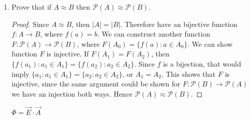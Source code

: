 \documentclass[11pt]{article}
\begin{document}
\begin{enumerate}
		\begin{proof}
			Assume that $\mathbb{R}\setminus \mathbb{Q}$ is countable. We know $\mathbb{Q}$ is countable. This would imply $(\mathbb{R}\setminus\mathbb{Q})\cup \mathbb{Q}=\mathbb{R}$ is countable. This is false however, so $\mathbb{R}\setminus \mathbb{Q}$ must be uncountable.
		\end{proof}
	
		\item Prove that if $A\approx B$ then $\mathscr{P}(A)\approx \mathscr{P}(B)$.
		
		\begin{proof}
			Since $A\approx B$, then $|A|=|B|$. Therefore have an bijective function $f:A\to B$, where $f(a)=b$. We can construct another function $F:\mathscr{P}(A)\to \mathscr{P}(B)$, where $F(A_0)=\{f(a):a\in A_0 \}$. We can show function $F$ is injective. If $F(A_1)=F(A_2)$, then $\{f(a_1):a_1\in A_1\}=\{f(a_2):a_2\in A_2\}$. Since $f$ is a bijection, that would imply $\{a_1:a_1\in A_1 \}=\{a_2:a_2\in A_2 \}$, or $A_1=A_2$. This shows that $F$ is injective, since the same argument could be shown for $F:\mathscr{P}(B)\to\mathscr{P}(A)$ we have an injection both ways. Hence $\mathscr{P}(A)\approx \mathscr{P}(B)$.
		\end{proof}
	
	$\Phi=\vec{E}  	\cdot \vec{A}$
	\end{enumerate}
	
\end{document}
